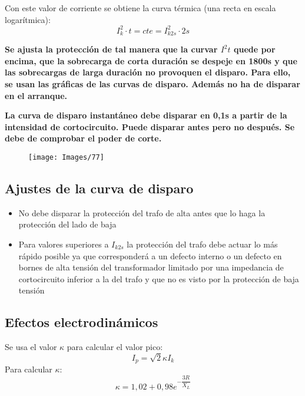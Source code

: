 Con este valor de corriente se obtiene la curva térmica (una recta en escala logarítmica):
\begin{equation}
	I_k^2\cdot t= cte =I_{k2s}^2\cdot 2s
\end{equation}

\textbf{Se ajusta la protección de tal manera que la curvar $I^2t$ quede por encima, que la sobrecarga de corta duración se despeje en 1800s y que las sobrecargas de larga duración no provoquen el disparo. Para ello, se usan las gráficas de las curvas de disparo. Además no ha de disparar en el arranque.}
\newline

\textbf{La curva de disparo instantáneo debe disparar en 0,1s a partir de la intensidad de cortocircuito. Puede disparar antes pero no después. Se debe de comprobar el poder de corte.}
\begin{figure}[H]
	\centering
	\texttt{[image: Images/77]}
	\label{fig:77}
\end{figure}

\subsection{Ajustes de la curva de disparo}
\begin{itemize}
	\item No debe disparar la protección del trafo de alta antes que lo haga la protección del lado de baja
	\item Para valores superiores a $I_{k2s}$ la protección del trafo debe actuar lo más rápido posible ya que corresponderá a un defecto interno o un defecto en bornes de alta tensión del transformador limitado por una impedancia de cortocircuito inferior a la del trafo y que no es visto por la protección de baja tensión
\end{itemize}
\subsection{Efectos electrodinámicos}
Se usa  el valor $\kappa$ para calcular el valor pico:
\begin{equation}
	I_p=\sqrt{2}\kappa I_k
\end{equation}
Para calcular $\kappa$:
\begin{equation}
	\kappa=1,02+0,98e^{-\dfrac{3R}{X_L}}
\end{equation}